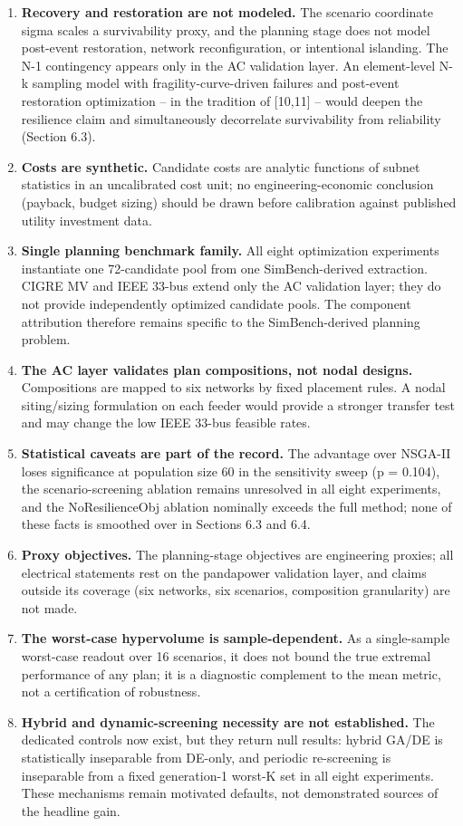 \documentclass[
  10pt,
  a4paper,
]{article}
\begin{document}
\begin{enumerate}
\def\labelenumi{\arabic{enumi}.}
\item
  \textbf{Recovery and restoration are not modeled.} The scenario
  coordinate sigma scales a survivability proxy, and the planning stage
  does not model post-event restoration, network reconfiguration, or
  intentional islanding. The N-1 contingency appears only in the AC
  validation layer. An element-level N-k sampling model with
  fragility-curve-driven failures and post-event restoration
  optimization -- in the tradition of {[}10,11{]} -- would deepen the
  resilience claim and simultaneously decorrelate survivability from
  reliability (Section 6.3).
\item
  \textbf{Costs are synthetic.} Candidate costs are analytic functions
  of subnet statistics in an uncalibrated cost unit; no
  engineering-economic conclusion (payback, budget sizing) should be
  drawn before calibration against published utility investment data.
\item
  \textbf{Single planning benchmark family.} All eight optimization
  experiments instantiate one 72-candidate pool from one
  SimBench-derived extraction. CIGRE MV and IEEE 33-bus extend only the
  AC validation layer; they do not provide independently optimized
  candidate pools. The component attribution therefore remains specific
  to the SimBench-derived planning problem.
\item
  \textbf{The AC layer validates plan compositions, not nodal designs.}
  Compositions are mapped to six networks by fixed placement rules. A
  nodal siting/sizing formulation on each feeder would provide a
  stronger transfer test and may change the low IEEE 33-bus feasible
  rates.
\item
  \textbf{Statistical caveats are part of the record.} The advantage
  over NSGA-II loses significance at population size 60 in the
  sensitivity sweep (p = 0.104), the scenario-screening ablation remains
  unresolved in all eight experiments, and the NoResilienceObj ablation
  nominally exceeds the full method; none of these facts is smoothed
  over in Sections 6.3 and 6.4.
\item
  \textbf{Proxy objectives.} The planning-stage objectives are
  engineering proxies; all electrical statements rest on the pandapower
  validation layer, and claims outside its coverage (six networks, six
  scenarios, composition granularity) are not made.
\item
  \textbf{The worst-case hypervolume is sample-dependent.} As a
  single-sample worst-case readout over 16 scenarios, it does not bound
  the true extremal performance of any plan; it is a diagnostic
  complement to the mean metric, not a certification of robustness.
\item
  \textbf{Hybrid and dynamic-screening necessity are not established.}
  The dedicated controls now exist, but they return null results: hybrid
  GA/DE is statistically inseparable from DE-only, and periodic
  re-screening is inseparable from a fixed generation-1 worst-K set in
  all eight experiments. These mechanisms remain motivated defaults, not
  demonstrated sources of the headline gain.
\end{enumerate}
\end{document}
